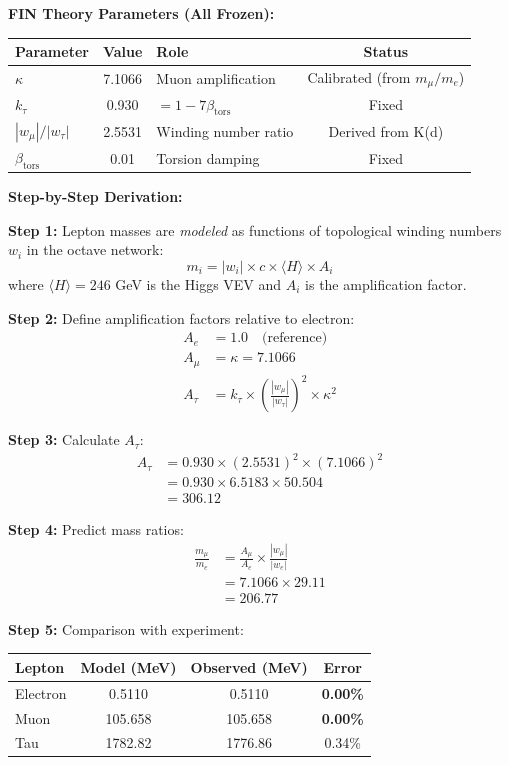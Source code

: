 \documentclass[11pt,a4paper]{book}
\theoremstyle{remark}
\newcommand{\betators}{\beta_{\text{tors}}}
\begin{document}
\textbf{FIN Theory Parameters (All Frozen):}
\begin{table}[H]
\centering
\begin{tabular}{|l|c|l|c|}
\hline
\textbf{Parameter} & \textbf{Value} & \textbf{Role} & \textbf{Status} \\
\hline
$\kappa$ & 7.1066 & Muon amplification & Calibrated (from $m_\mu/m_e$) \\
$k_\tau$ & 0.930 & $= 1 - 7\betators$ & Fixed \\
$|w_\mu|/|w_\tau|$ & 2.5531 & Winding number ratio & Derived from K(d) \\
$\betators$ & 0.01 & Torsion damping & Fixed \\
\hline
\end{tabular}
\end{table}

\textbf{Step-by-Step Derivation:}

\textbf{Step 1:} Lepton masses are \textit{modeled} as functions of topological winding numbers $w_i$ in the octave network:
\begin{equation}
m_i = |w_i| \times c \times \langle H \rangle \times A_i
\end{equation}
where $\langle H \rangle = 246$ GeV is the Higgs VEV and $A_i$ is the amplification factor.

\textbf{Step 2:} Define amplification factors relative to electron:
\begin{align}
A_e &= 1.0 \quad \text{(reference)} \\
A_\mu &= \kappa = 7.1066 \\
A_\tau &= k_\tau \times \left(\frac{|w_\mu|}{|w_\tau|}\right)^2 \times \kappa^2
\end{align}

\textbf{Step 3:} Calculate $A_\tau$:
\begin{align}
A_\tau &= 0.930 \times (2.5531)^2 \times (7.1066)^2 \\
&= 0.930 \times 6.5183 \times 50.504 \\
&= 306.12
\end{align}

\textbf{Step 4:} Predict mass ratios:
\begin{align}
\frac{m_\mu}{m_e} &= \frac{A_\mu}{A_e} \times \frac{|w_\mu|}{|w_e|} \\
&= 7.1066 \times 29.11 \\
&= 206.77
\end{align}

\textbf{Step 5:} Comparison with experiment:
\begin{table}[H]
\centering
\begin{tabular}{|l|c|c|c|}
\hline
\textbf{Lepton} & \textbf{Model (MeV)} & \textbf{Observed (MeV)} & \textbf{Error} \\
\hline
Electron & 0.5110 & 0.5110 & \textbf{0.00\%} \\
Muon & 105.658 & 105.658 & \textbf{0.00\%} \\
Tau & 1782.82 & 1776.86 & 0.34\% \\
\hline
\end{tabular}
\end{table}
\end{document}
